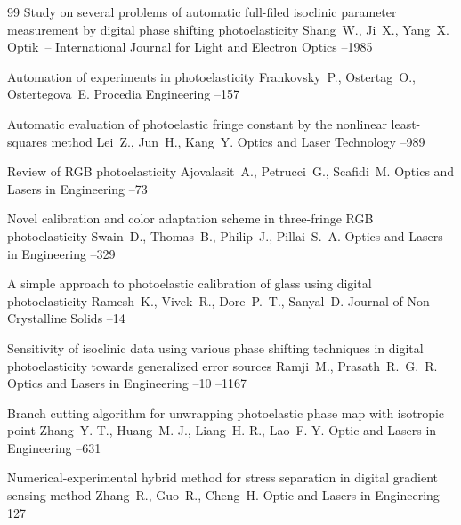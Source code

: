 \begin{thebibliography}{99}
\paper Study on several problems of automatic full-filed isoclinic parameter measurement  by digital phase shifting photoelasticity
\by Shang~W., Ji~X., Yang~X.
\jour Optik~– International Journal for Light and Electron Optics
--1985

\paper Automation of experiments in photoelasticity
\by Frankovsky~P., Ostertag~O., Ostertegova~E.
\jour Procedia Engineering
--157


\paper Automatic evaluation of photoelastic fringe constant by the nonlinear least-squares method
\by  Lei~Z., Jun~H., Kang~Y.
\jour Optics and Laser Technology
--989

\paper Review of RGB photoelasticity
\by  Ajovalasit~A., Petrucci~G., Scafidi~M.
\jour Optics and Lasers in Engineering
--73

\paper Novel calibration and color adaptation scheme in three-fringe RGB photoelasticity
\by Swain~D., Thomas~B., Philip~J., Pillai~S.~A.
\jour Optics and Lasers in Engineering
--329

\paper A simple approach to photoelastic calibration of glass using digital photoelasticity
\by Ramesh~K., Vivek~R., Dore~P.~T., Sanyal~D.
\jour Journal of Non-Crystalline Solids
--14

\paper Sensitivity of isoclinic data using various phase shifting techniques in digital photoelasticity towards generalized error sources
\by Ramji~M., Prasath~R.~G.~R.
\jour Optics and Lasers in Engineering
--10
--1167


\paper Branch cutting algorithm for unwrapping photoelastic phase map with isotropic point
\by Zhang~Y.-T., Huang~M.-J., Liang~H.-R., Lao~F.-Y.
\jour Optic and Lasers in Engineering
--631

\paper Numerical-experimental hybrid method for stress separation in digital gradient sensing method
\by  Zhang~R., Guo~R., Cheng~H.
\jour Optic and Lasers in Engineering
--127


\end{thebibliography}
